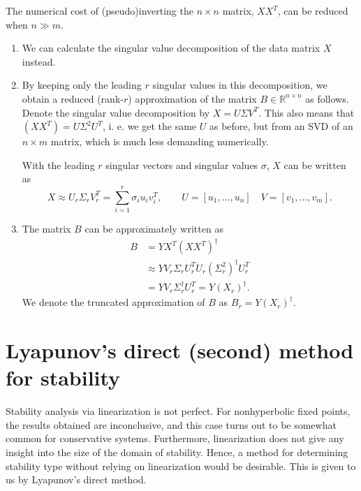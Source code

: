 \begin{remark}[]
The numerical cost of (pseudo)inverting the $n \times n$ matrix, $XX^T$, can be reduced when $n\gg m$.
\begin{enumerate}
\item We can calculate the singular value decomposition of the data matrix $X$ instead. 
\item By keeping only the leading $r$ singular values in this decomposition, we obtain a reduced (rank-$r$) approximation of the matrix $B\in \mathbb{R}^{n \times n}$ as follows. Denote the singular value decomposition by $X = U\Sigma V^T$.  This also means that $(XX^T) = U\Sigma^2 U^T$, i. e. we get the same $U$ as before, but from an SVD of an $n\times m$ matrix, which is much less demanding numerically.

 With the leading $r$ singular vectors and singular values $\sigma$, $X$ can be written as
\begin{equation}
X \approx U_r \Sigma_r V_r^T = \sum_{i=1}^r \sigma_i u_i v_i^T, \qquad U = [u_1, ..., u_n]\quad V = [v_1, ..., v_m].
\end{equation}
\item The matrix $B$ can be approximately written as 
\begin{align}
B &= YX^T(XX^T)^\dagger \\
& \approx YV_r\Sigma_rU_r^TU_r(\Sigma_r^2)^\dagger U_r^T \\
&= YV_r\Sigma_r^\dagger U_r^T = Y(X_r)^\dagger.
\end{align}We denote the truncated approximation of $B$ as $B_r = Y (X_r)^\dagger.$
\end{enumerate}
\end{remark}
	
	
\section{Lyapunov's direct (second) method for stability}
Stability analysis via linearization is not perfect. For nonhyperbolic fixed points, the results obtained are inconclusive, and this case turns out to be somewhat common for conservative systems. Furthermore, linearization does not give any insight into the size of the domain of stability. Hence, a method for determining stability type without relying on linearization would be desirable. This is given to us by Lyapunov's direct method.

